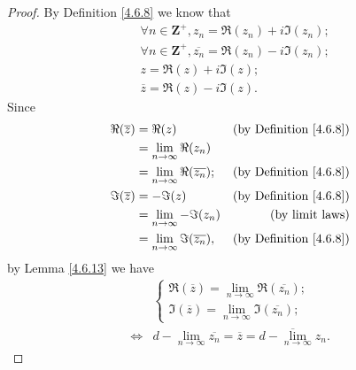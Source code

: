 \begin{proof}
    By Definition \ref{4.6.8} we know that
    \begin{align*}
         & \forall n \in \mathbf{Z}^+, z_n = \Re(z_n) + i \Im(z_n);            \\
         & \forall n \in \mathbf{Z}^+, \overline{z_n} = \Re(z_n) - i \Im(z_n); \\
         & z = \Re(z) + i \Im(z);                                              \\
         & \overline{z} = \Re(z) - i \Im(z).
    \end{align*}
    Since
    \begin{align*}
        \Re(\overline{z}) & = \Re(z)                                   & \text{(by Definition \ref{4.6.8})} \\
                          & = \lim_{n \to \infty} \Re(z_n)                                                  \\
                          & = \lim_{n \to \infty} \Re(\overline{z_n}); & \text{(by Definition \ref{4.6.8})} \\
        \Im(\overline{z}) & = -\Im(z)                                  & \text{(by Definition \ref{4.6.8})} \\
                          & = \lim_{n \to \infty} -\Im(z_n)            & \text{(by limit laws)}             \\
                          & = \lim_{n \to \infty} \Im(\overline{z_n}), & \text{(by Definition \ref{4.6.8})}
    \end{align*}
    by Lemma \ref{4.6.13} we have
    \begin{align*}
             & \begin{cases}
                   \Re(\overline{z}) = \lim_{n \to \infty} \Re(\overline{z_n}); \\
                   \Im(\overline{z}) = \lim_{n \to \infty} \Im(\overline{z_n});
               \end{cases}                                    \\
        \iff & d - \lim_{n \to \infty} \overline{z_n} = \overline{z} = \overline{d - \lim_{n \to \infty} z_n}.
    \end{align*}


\end{proof}
